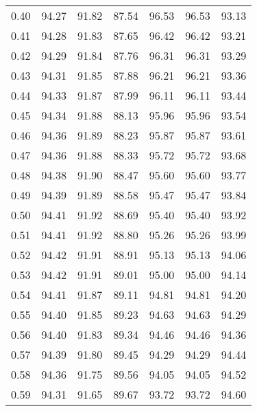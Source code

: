 \begin{tabular}{|c|c|c|c|c|c|c|}
      0.40 &     94.27 &     91.82 &      87.54 &   96.53 &      96.53 &         93.13 \\
      0.41 &     94.28 &     91.83 &      87.65 &   96.42 &      96.42 &         93.21 \\
      0.42 &     94.29 &     91.84 &      87.76 &   96.31 &      96.31 &         93.29 \\
      0.43 &     94.31 &     91.85 &      87.88 &   96.21 &      96.21 &         93.36 \\
      0.44 &     94.33 &     91.87 &      87.99 &   96.11 &      96.11 &         93.44 \\
      0.45 &     94.34 &     91.88 &      88.13 &   95.96 &      95.96 &         93.54 \\
      0.46 &     94.36 &     91.89 &      88.23 &   95.87 &      95.87 &         93.61 \\
      0.47 &     94.36 &     91.88 &      88.33 &   95.72 &      95.72 &         93.68 \\
      0.48 &     94.38 &     91.90 &      88.47 &   95.60 &      95.60 &         93.77 \\
      0.49 &     94.39 &     91.89 &      88.58 &   95.47 &      95.47 &         93.84 \\
      0.50 &     94.41 &     91.92 &      88.69 &   95.40 &      95.40 &         93.92 \\
      0.51 &     94.41 &     91.92 &      88.80 &   95.26 &      95.26 &         93.99 \\
      0.52 &     94.42 &     91.91 &      88.91 &   95.13 &      95.13 &         94.06 \\
      0.53 &     94.42 &     91.91 &      89.01 &   95.00 &      95.00 &         94.14 \\
      0.54 &     94.41 &     91.87 &      89.11 &   94.81 &      94.81 &         94.20 \\
      0.55 &     94.40 &     91.85 &      89.23 &   94.63 &      94.63 &         94.29 \\
      0.56 &     94.40 &     91.83 &      89.34 &   94.46 &      94.46 &         94.36 \\
      0.57 &     94.39 &     91.80 &      89.45 &   94.29 &      94.29 &         94.44 \\
      0.58 &     94.36 &     91.75 &      89.56 &   94.05 &      94.05 &         94.52 \\
      0.59 &     94.31 &     91.65 &      89.67 &   93.72 &      93.72 &         94.60 \\

\end{tabular}
